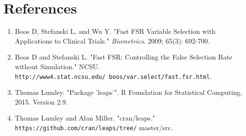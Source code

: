 \documentclass[12pt]{article}
\begin{document}
\section*{References}
\begin{enumerate}
    \item Boos D, Stefanski L, and Wu Y. "Fast FSR Variable Selection with Applications to Clinical Trials." \textit{Biometrics}. 
          2009; 65(3): 692-700.
    \item Boos D and Stefanski L. "Fast FSR: Controlling the False Selection Rate without Simulation." NCSU. 
            \texttt{http://www4.stat.ncsu.edu/~boos/var.select/fast.fsr.html}.
    \item Thomas Lumley. "Package 'leaps'". R Foundation for Statistical Computing, 2015. Version 2.9.
    \item Thomas Lumley and Alan Miller. "cran/leaps." \texttt{https://github.com/cran/leaps/tree/}
master/src.
\end{enumerate}
\end{document}
